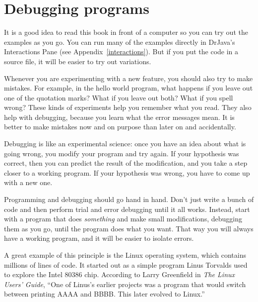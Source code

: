 \section{Debugging programs}
\label{sec:examples}

It is a good idea to read this book in front of a computer so you can try out the examples as you go.
You can run many of the examples directly in DrJava's Interactions Pane (see Appendix~\ref{interactions}).
But if you put the code in a source file, it will be easier to try out variations.


Whenever you are experimenting with a new feature, you should also try to make mistakes.
For example, in the hello world program, what happens if you leave out one of the quotation marks?
What if you leave out both?
What if you spell  wrong?
These kinds of experiments help you remember what you read.
They also help with debugging, because you learn what the error messages mean.
It is better to make mistakes now and on purpose than later on and accidentally.



Debugging is like an experimental science: once you have an idea about what is going wrong, you modify your program and try again.
If your hypothesis was correct, then you can predict the result of the modification, and you take a step closer to a working program.
If your hypothesis was wrong, you have to come up with a new one.

Programming and debugging should go hand in hand.
Don't just write a bunch of code and then perform trial and error debugging until it all works.
Instead, start with a program that does {\em something} and make small modifications, debugging them as you go, until the program does what you want.
That way you will always have a working program, and it will be easier to isolate errors.


A great example of this principle is the Linux operating system, which contains millions of lines of code.
It started out as a simple program Linus Torvalds used to explore the Intel 80386 chip.
According to Larry Greenfield in {\it The Linux Users' Guide}, ``One of Linus's earlier projects was a program that would switch between printing AAAA and BBBB.
This later evolved to Linux.''


